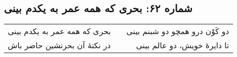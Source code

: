 \begin{center}
\section*{شماره ۶۲: بحری که همه عمر به یکدم بینی}
\label{sec:062}
\begin{longtable}{l p{0.5cm} r}
بحری که همه عمر به یکدم بینی
&&
دو کَوْن درو همچو دو شبنم بینی
\\
در نکتهٔ آن بحرنشین حاضر باش
&&
تا دایرهٔ خویش، دو عالم بینی
\\
\end{longtable}
\end{center}
